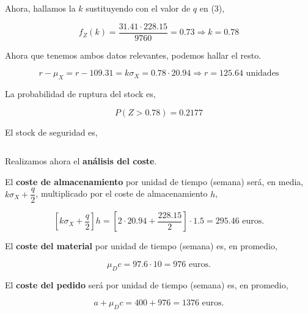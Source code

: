 \documentclass[a4paper,12pt]{article}
\begin{document}
Ahora, hallamos la $k$ sustituyendo con el valor de $q$ en (3),

$$ f_Z(k) = \dfrac{31.41\cdot 228.15}{9760} = 0.73 \Rightarrow k = 0.78$$

Ahora que tenemos ambos datos relevantes, podemos hallar el resto.

$$r - \mu_X = r - 109.31 = k\sigma_X = 0.78\cdot 20.94 \Rightarrow r = 125.64\text{ unidades}$$ 

La probabilidad de ruptura del stock es,

$$ P(Z > 0.78) = 0.2177$$

El stock de seguridad es,

$$ $$


%




\smallskip

Realizamos ahora el \textbf{an\'alisis del coste}. 



El \textbf{coste de almacenamiento} por unidad de tiempo (semana) ser\'a, en media, $k\sigma_X + \dfrac{q}{2}$, multiplicado por el coste de almacenamiento $h$,

$$ \left[k\sigma_X + \dfrac{q}{2}\right] h = \left[2\cdot 20.94 + \dfrac{228.15}{2} \right]\cdot 1.5 = 295.46\text{ euros.}$$

El \textbf{coste del material} por unidad de tiempo (semana) es, en promedio,

$$ \mu_D c = 97.6\cdot 10 = 976 \text{ euros.}$$

El \textbf{coste del pedido} ser\'a por unidad de tiempo (semana) es, en promedio,

$$ a + \mu_D c = 400 + 976 = 1376 \text{ euros.}$$
\end{document}
